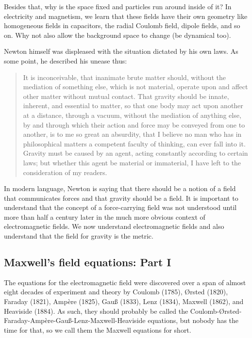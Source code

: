 Besides that, why is the space fixed and particles run around inside of it? In electricity and magnetism, we learn that these fields have their own geometry like homogeneous fields in capacitors, the radial Coulomb field, dipole fields, and so on. Why not also allow the background space to change (\ie{}be dynamical too). 

Newton himself was displeased with the situation dictated by his own laws. As some point, he described his unease thus:
\begin{quote}
It is inconceivable, that inanimate brute matter should, without the mediation of something else, which is not material, operate upon and affect other matter without mutual contact. That gravity should be innate, inherent, and essential to matter, so that one body may act upon another at a distance, through a vacuum, without the mediation of anything else, by and through which their action and force may be conveyed from one to another, is to me so great an absurdity, that I believe no man who has in philosophical matters a competent faculty of thinking, can ever fall into it. Gravity must be caused by an agent, acting constantly according to certain laws; but whether this agent be material or immaterial, I have left to the consideration of my readers.
\end{quote}

In modern language, Newton is saying that there should be a notion of a field that communicates forces and that gravity should be a field. It is important to understand that the concept of a force-carrying field was not understood until more than half a century later in the much more obvious context of electromagnetic fields. We now understand electromagnetic fields and also understand that the field for gravity is the metric. 


\subsection{Maxwell's field equations: Part I}

The equations for the electromagnetic field were discovered over a span of almost eight decades of experiment and theory by Coulomb (1785), Ørsted (1820), Faraday (1821), Ampère (1825), Gau\ss{} (1833), Lenz (1834), Maxwell (1862), and Heaviside (1884). As such, they should probably be called the Coulomb-Ørsted-Faraday-Ampère-Gau\ss{}-Lenz-Maxwell-Heaviside equations, but nobody has the time for that, so we call them the Maxwell equations for short. 

